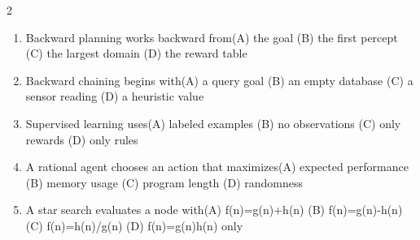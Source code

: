 \documentclass[a4paper]{article}
\begin{document}
\begin{multicols*}{2}
\begin{enumerate}[resume]
\item Backward planning works backward from\newline\hspace*{0.6em}(A) the goal \quad (B) the first percept \newline\hspace*{0.6em}(C) the largest domain \quad (D) the reward table
\item Backward chaining begins with\newline\hspace*{0.6em}(A) a query goal \quad (B) an empty database \newline\hspace*{0.6em}(C) a sensor reading \quad (D) a heuristic value
\item Supervised learning uses\newline\hspace*{0.6em}(A) labeled examples \quad (B) no observations \newline\hspace*{0.6em}(C) only rewards \quad (D) only rules
\item A rational agent chooses an action that maximizes\newline\hspace*{0.6em}(A) expected performance \quad (B) memory usage \newline\hspace*{0.6em}(C) program length \quad (D) randomness
\item A star search evaluates a node with\newline\hspace*{0.6em}(A) f(n)=g(n)+h(n) \quad (B) f(n)=g(n)-h(n) \newline\hspace*{0.6em}(C) f(n)=h(n)/g(n) \quad (D) f(n)=g(n)h(n) only
\end{enumerate}
\end{multicols*}
\end{document}
